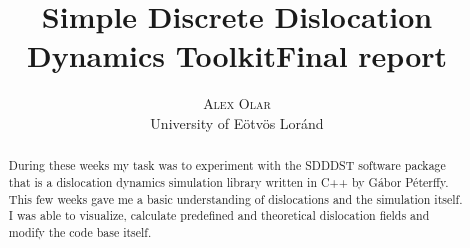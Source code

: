 \documentclass[12pt,a4paper]{article}
\title{Simple Discrete Dislocation Dynamics Toolkit\newline\textbf{Final report}}
\author{\Large{\textsc{Alex Olar}} \vspace{10pt}\\
	\textrm{University of Eötvös Loránd}
	}
\date{}
\theoremstyle{plain}
\begin{document}
\maketitle

\newpage

\tableofcontents

\vfill

\begin{abstract}
	During these weeks my task was to experiment with the
	SDDDST software package \cite{sdddst} that is a dislocation dynamics
	simulation library written in C++ by Gábor Péterffy. This
	few weeks gave me a basic understanding of dislocations and the
	simulation itself. I was able to visualize, calculate predefined and
	theoretical dislocation fields and modify the code base itself.
\end{abstract}

\newpage
\end{document}
